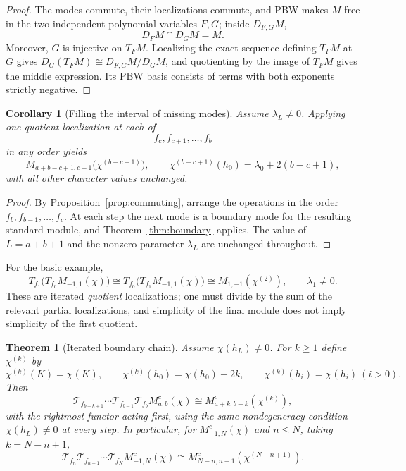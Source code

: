 \documentclass[11pt,a4paper]{article}
\newcommand{\T}{\mathcal T}
\theoremstyle{plainupright}
\newtheorem{theorem}[proposition]{Theorem}
\newtheorem{corollary}[proposition]{Corollary}
\begin{document}
\begin{proof}
The modes commute, their localizations commute, and PBW makes \(M\) free in
the two independent polynomial variables \(F,G\); inside \(D_{F,G}M\),
\[
D_FM\cap D_GM=M.
\]
Moreover, \(G\) is injective on \(T_FM\). Localizing the exact sequence
defining \(T_FM\) at \(G\) gives
\(D_G(T_FM)\cong D_{F,G}M/D_GM\), and quotienting by the image of \(T_FM\)
gives the middle expression. Its PBW basis consists of terms with both
exponents strictly negative.
\end{proof}

\begin{corollary}[Filling the interval of missing modes]\label{cor:fill}
Assume \(\lambda_L\ne0\). Applying one quotient localization at each of
\[
f_c,f_{c+1},\ldots,f_b
\]
in any order yields
\[
M_{a+b-c+1,c-1}\bigl(\chi^{(b-c+1)}\bigr),
\qquad
\chi^{(b-c+1)}(h_0)=\lambda_0+2(b-c+1),
\]
with all other character values unchanged.
\end{corollary}

\begin{proof}
By Proposition~\ref{prop:commuting}, arrange the operations in the order
\(f_b,f_{b-1},\ldots,f_c\). At each step the next mode is a boundary mode for
the resulting standard module, and Theorem~\ref{thm:boundary} applies. The
value of \(L=a+b+1\) and the nonzero parameter \(\lambda_L\) are unchanged
throughout.
\end{proof}

For the basic example,
\[
T_{f_1}\bigl(T_{f_0}M_{-1,1}(\chi)\bigr)
\cong T_{f_0}\bigl(T_{f_1}M_{-1,1}(\chi)\bigr)
\cong M_{1,-1}(\chi^{(2)}),\qquad \lambda_1\ne0.
\]
These are iterated \emph{quotient} localizations; one must divide by the sum
of the relevant partial localizations, and simplicity of the final module does
not imply simplicity of the first quotient.

\begin{theorem}[Iterated boundary chain]\label{thm:iterated}
Assume \(\chi(h_L)\ne0\). For \(k\ge1\) define \(\chi^{(k)}\) by
\[
\chi^{(k)}(K)=\chi(K),\qquad
\chi^{(k)}(h_0)=\chi(h_0)+2k,\qquad
\chi^{(k)}(h_i)=\chi(h_i)\ (i>0).
\]
Then
\begin{equation}\label{eq:iterated}
\boxed{\ \T_{f_{b-k+1}}\cdots\T_{f_{b-1}}\T_{f_b}
M^c_{a,b}(\chi)\cong M^c_{a+k,b-k}(\chi^{(k)}),\ }
\end{equation}
with the rightmost functor acting first, using the same nondegeneracy
condition \(\chi(h_L)\ne0\) at every step. In particular, for
\(M^c_{-1,N}(\chi)\) and \(n\le N\), taking \(k=N-n+1\),
\begin{equation}\label{eq:iterated-special}
\boxed{\ \T_{f_n}\T_{f_{n+1}}\cdots\T_{f_N}
M^c_{-1,N}(\chi)\cong M^c_{N-n,n-1}(\chi^{(N-n+1)}).\ }
\end{equation}
\end{theorem}
\end{document}
